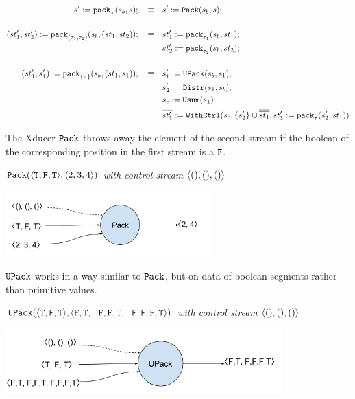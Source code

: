 \begin{align*}
s' := \Pack{s_b}{s}{\pi}; \quad \equiv & \quad s' := \packf{s_b}{s}; \\
\\
(st'_1,st'_2)  := \Pack{s_b}{(st_1,st_2)}{(\tau_1,\tau_2)}; \quad \equiv & \quad st_1' := \Pack{s_b}{st_1}{\tau_1}; \\ 
&\quad st_2' := \Pack{s_b}{st_2}{\tau_2};\\
\\
(st'_1,s_1')  := \Pack{s_b}{(st_1,s_1)}{\{\tau\}}; \quad \equiv & \quad s_1' := \upackf{s_b}{s_1}; \\ 
&\quad s_2' := \distrf{s_1}{s_b};\\
&\quad s_c := \usumf{s_1}; \\
&\quad \withctrl{s_c}{st_1' :=  \Pack{s_2'}{st_1}{\tau}}{\{s_2'\} \cup \olol{st_1}}{\olol{st'_1}} \\
\end{align*}



The Xducer $\pack$ throws away the element of the second stream if the boolean of the corresponding position in the first stream is a $\F$. 

\begin{example} \emph{$\pack({\<\T,\F,\T\'>}, \<2,3,4 \'>)$ with control stream $\< (),(), () \'>$}\\
	\begin{center}
		\includegraphics[width=0.6\textwidth]{fig/packxducer.png}
	\end{center}
\end{example}

$\upack$ works in a way similar to $\pack$, but on data of boolean segments rather than primitive values.
\begin{example} \emph{$\upack({\<\T,\F,\T\'>}, \< \F,\T,\ \ \F,\F,\T, \ \ \F,\F,\F, \T\'>)$ with control stream $\< (),(), () \'>$}\\
	\begin{center}
		\includegraphics[width=0.8\textwidth]{fig/upackxducer.png}
	\end{center}
\end{example}


